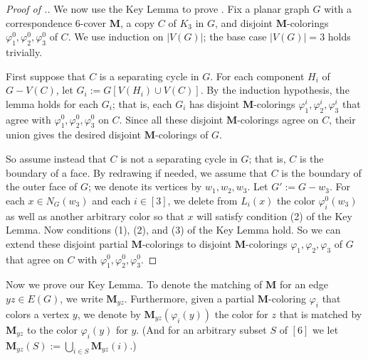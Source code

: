\documentclass[11pt]{article}
\theoremstyle{definition}
\newcommand\vph{\varphi}
\newcommand\MM{\textbf{M}}
\begin{document}
\begin{proof}[Proof of .]
	We now use the Key Lemma to prove .  Fix a planar graph $G$ with a correspondence
	6-cover $\MM$, a copy $C$ of $K_3$ in $G$, and disjoint $\MM$-colorings $\vph_1^0,\vph_2^0,\vph_3^0$
	of $C$.  We use induction on $|V(G)|$; the base case $|V(G)|=3$ holds trivially.

	First suppose that $C$ is a separating cycle in $G$.  For each component $H_i$ of $G-V(C)$, let
	$G_i:=G[V(H_i)\cup V(C)]$.  By the induction hypothesis, the lemma holds for each $G_i$; that is,
	each $G_i$ has disjoint $\MM$-colorings $\vph_1^i,\vph_2^i,\vph_3^i$ that agree with 
	$\vph_1^0,\vph_2^0,\vph_3^0$ on $C$.  Since all these disjoint $\MM$-colorings agree on $C$,
	their union gives the desired disjoint $\MM$-colorings of $G$.

	So assume instead that $C$ is not a separating cycle in $G$; that is, $C$ is the boundary of a face.
	By redrawing if needed, we assume that $C$ is the boundary of the outer face of $G$; we denote its
	vertices by $w_1,w_2,w_3$.  Let $G':=G-w_3$.  For each $x\in N_G(w_3)$ and each $i\in [3]$, we delete 
	from $L_i(x)$ the color $\vph_i^0(w_3)$ as well as another arbitrary color so that $x$ will satisfy
	condition (2) of the Key Lemma.  
	Now conditions (1), (2), and (3) of the Key Lemma hold.  So we can
	extend these disjoint partial $\MM$-colorings to disjoint $\MM$-colorings 
	$\vph_1,\vph_2,\vph_3$ of $G$ that agree on $C$ with $\vph_1^0,\vph_2^0,\vph_3^0$.
\end{proof}

Now we prove our Key Lemma.
To denote the matching of $\MM$ for an edge $yz\in E(G)$, we write $\MM_{yz}$.  Furthermore, given a partial
$\MM$-coloring $\vph_i$ that colors a vertex $y$, we denote by $\MM_{yz}(\vph_i(y))$ the color for $z$
that is matched by $\MM_{yz}$ to the color $\vph_i(y)$ for $y$.  (And for an arbitrary subset $S$ of $[6]$
we let $\MM_{yz}(S):=\bigcup_{i\in S}\MM_{yz}(i)$.)
\end{document}

